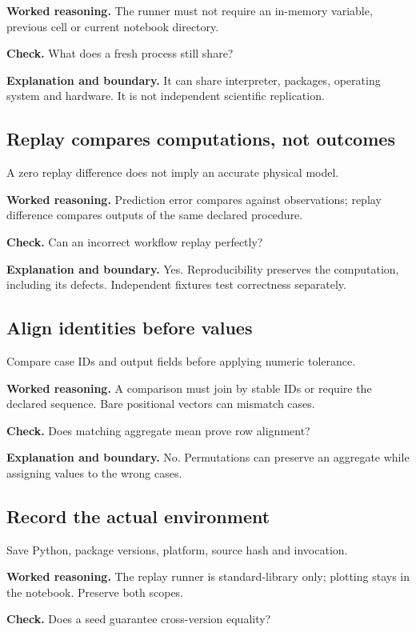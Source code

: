 \textbf{Worked reasoning.} The runner must not require an in-memory variable, previous cell or current notebook directory.

\textbf{Check.} What does a fresh process still share?

\textbf{Explanation and boundary.} It can share interpreter, packages, operating system and hardware. It is not independent scientific replication.

\subsection{Replay compares computations, not outcomes}
A zero replay difference does not imply an accurate physical model.

\textbf{Worked reasoning.} Prediction error compares against observations; replay difference compares outputs of the same declared procedure.

\textbf{Check.} Can an incorrect workflow replay perfectly?

\textbf{Explanation and boundary.} Yes. Reproducibility preserves the computation, including its defects. Independent fixtures test correctness separately.

\subsection{Align identities before values}
Compare case IDs and output fields before applying numeric tolerance.

\textbf{Worked reasoning.} A comparison must join by stable IDs or require the declared sequence. Bare positional vectors can mismatch cases.

\textbf{Check.} Does matching aggregate mean prove row alignment?

\textbf{Explanation and boundary.} No. Permutations can preserve an aggregate while assigning values to the wrong cases.

\subsection{Record the actual environment}
Save Python, package versions, platform, source hash and invocation.

\textbf{Worked reasoning.} The replay runner is standard-library only; plotting stays in the notebook. Preserve both scopes.

\textbf{Check.} Does a seed guarantee cross-version equality?

